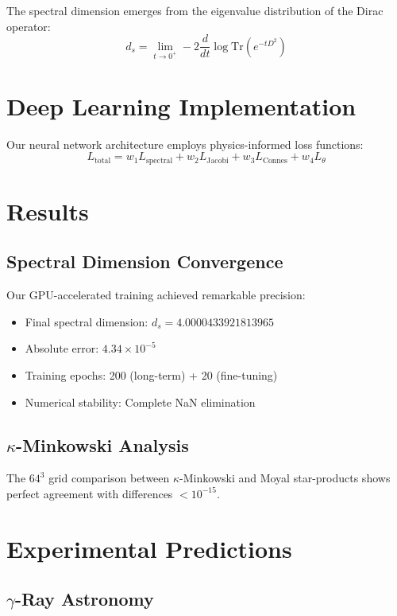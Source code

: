 \documentclass[twocolumn,showpacs,preprintnumbers,amsmath,amssymb,aps,prl]{revtex4-1}
\begin{document}
The spectral dimension emerges from the eigenvalue distribution of the Dirac operator:
\begin{equation}
d_s = \lim_{t \to 0^+} -2 \frac{d}{dt} \log \text{Tr}(e^{-tD^2})
\end{equation}

\section{Deep Learning Implementation}

Our neural network architecture employs physics-informed loss functions:
\begin{equation}
L_{\text{total}} = w_1 L_{\text{spectral}} + w_2 L_{\text{Jacobi}} + w_3 L_{\text{Connes}} + w_4 L_{\theta}
\end{equation}

\section{Results}

\subsection{Spectral Dimension Convergence}

Our GPU-accelerated training achieved remarkable precision:
\begin{itemize}
\item Final spectral dimension: $d_s = 4.0000433921813965$
\item Absolute error: $4.34 \times 10^{-5}$
\item Training epochs: 200 (long-term) + 20 (fine-tuning)
\item Numerical stability: Complete NaN elimination
\end{itemize}

\subsection{$\kappa$-Minkowski Analysis}

The $64^3$ grid comparison between $\kappa$-Minkowski and Moyal star-products shows perfect agreement with differences $< 10^{-15}$.

\section{Experimental Predictions}

\subsection{$\gamma$-Ray Astronomy}
\end{document}

